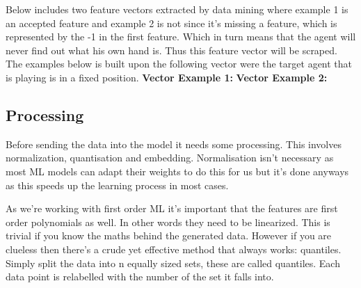 \documentclass[../main.tex]{subfiles}
\begin{document}
 Below includes two feature vectors  extracted by data mining where example 1 is an accepted feature and example 2 is not since it's missing a feature, which is represented by the -1 in the first feature. Which in turn means that the agent will never find out what his own hand is. Thus this feature vector will be scraped. The examples below is built upon the following vector were the target agent that is playing is in a fixed position. 
\newline{}
\newline\newline
\textbf{Vector Example 1:}  
\newline\newline
\textbf{Vector Example 2:} 

\subsection{Processing}

Before sending the data into the model it needs some processing. This involves normalization, quantisation and embedding. Normalisation isn't necessary as most ML models can adapt their weights to do this for us but it's done anyways as this speeds up the learning process in most cases. 

As we're working with first order ML it's important that the features are first order polynomials as well. In other words they need to be linearized. This is trivial if you know the maths behind the generated data. However if you are clueless then there's a crude yet effective method that always works: quantiles. Simply split the data into n equally sized sets, these are called quantiles. Each data point is relabelled with the number of the set it falls into. 
\end{document}

